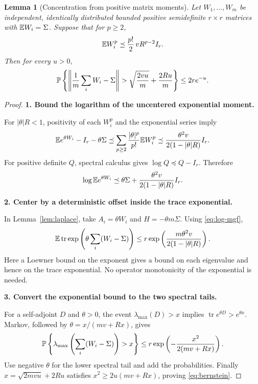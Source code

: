 \documentclass[11pt]{article}
\numberwithin{equation}{section}
\newtheorem{lemma}[theorem]{Lemma}
\theoremstyle{definition}\newtheorem{definition}[theorem]{Definition}
\theoremstyle{remark}\newtheorem{remark}[theorem]{Remark}
\newcommand{\tr}{\operatorname{tr}}\newcommand{\Ent}{\operatorname{Ent}}
\newcommand{\step}[1]{\par\addvspace{.65\baselineskip}\Needspace{4\baselineskip}\noindent\textbf{#1}\par\nobreak\smallskip}
\begin{document}
\begin{lemma}[Concentration from positive matrix moments]\label{lem:bernstein}
Let $W_1,\ldots,W_m$ be independent, identically distributed bounded positive
semidefinite $r\times r$ matrices with $\mathbb E W_i=\Sigma$. Suppose that for $p\ge2$,
\[
 \mathbb E W_i^p\preceq\frac{p!}{2}\,vR^{p-2}I_r.
\]
Then for every $u>0$,
\begin{equation}\label{eq:bernstein}
 \mathbb P\left\{\left\|\frac1m\sum_iW_i-\Sigma\right\|
 >\sqrt{\frac{2vu}{m}}+\frac{2Ru}{m}\right\}\le2re^{-u}.
\end{equation}
\end{lemma}
\begin{proof}
\step{1. Bound the logarithm of the uncentered exponential moment.}
For $|\theta|R<1$, positivity of each $W_i^p$ and the exponential series imply
\[
 \mathbb E e^{\theta W_i}-I_r-\theta\Sigma
 \preceq\sum_{p\ge2}\frac{|\theta|^p}{p!}\mathbb E W_i^p
 \preceq\frac{\theta^2v}{2(1-|\theta|R)}I_r.
\]
For positive definite $Q$, spectral calculus gives $\log Q\preceq Q-I_r$.
Therefore
\begin{equation}\label{eq:log-mgf}
 \log\mathbb E e^{\theta W_i}
 \preceq\theta\Sigma+
 \frac{\theta^2v}{2(1-|\theta|R)}I_r.
\end{equation}

\step{2. Center by a deterministic offset inside the trace exponential.}
In Lemma~\ref{lem:laplace}, take $A_i=\theta W_i$ and $H=-\theta m\Sigma$.
Using \eqref{eq:log-mgf},
\[
 \E\tr\exp\left(\theta\sum_i(W_i-\Sigma)\right)
 \le r\exp\left(\frac{m\theta^2v}{2(1-|\theta|R)}\right).
\]
Here a Loewner bound on the exponent gives a bound on each eigenvalue and hence
on the trace exponential. No operator monotonicity of the exponential is needed.

\step{3. Convert the exponential bound to the two spectral tails.}
For a self-adjoint $D$ and $\theta>0$, the event $\lambda_{\max}(D)>x$ implies
$\tr e^{\theta D}>e^{\theta x}$. Markov, followed by
$\theta=x/(mv+Rx)$, gives
\[
 \mathbb P\left\{\lambda_{\max}\left(\sum_i(W_i-\Sigma)\right)>x\right\}
 \le r\exp\left(-\frac{x^2}{2(mv+Rx)}\right).
\]
Use negative $\theta$ for the lower spectral tail and add the probabilities.
Finally $x=\sqrt{2mvu}+2Ru$ satisfies $x^2\ge2u(mv+Rx)$, proving
\eqref{eq:bernstein}.
\end{proof}
\end{document}
